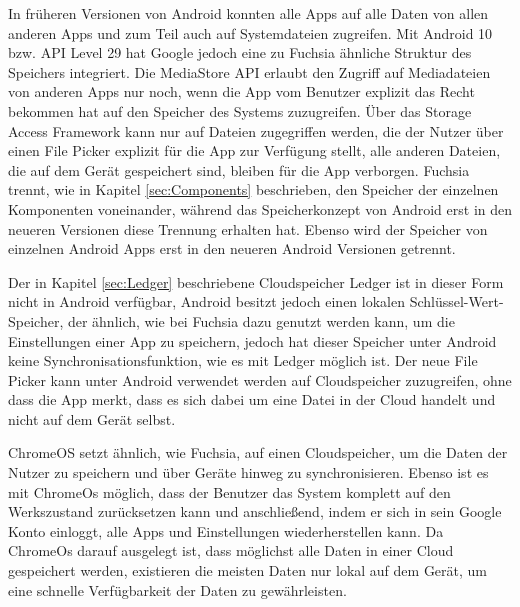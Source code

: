 \documentclass[a4paper]{scrartcl}
\begin{document}
In früheren Versionen von Android konnten alle Apps auf alle Daten von allen anderen Apps und zum Teil auch auf Systemdateien zugreifen. Mit Android 10 bzw. API Level 29 hat Google jedoch eine zu Fuchsia ähnliche Struktur des Speichers integriert. Die MediaStore API erlaubt den Zugriff auf Mediadateien von anderen Apps nur noch, wenn die App vom Benutzer explizit das Recht bekommen hat auf den Speicher des Systems zuzugreifen. Über das Storage Access Framework kann nur auf Dateien zugegriffen werden, die der Nutzer über einen File Picker explizit für die App zur Verfügung stellt, alle anderen Dateien, die auf dem Gerät gespeichert sind, bleiben für die App verborgen. Fuchsia trennt, wie in Kapitel \ref{sec:Components} beschrieben, den Speicher der einzelnen Komponenten voneinander, während das Speicherkonzept von Android erst in den neueren Versionen diese Trennung erhalten hat. Ebenso wird der Speicher von einzelnen Android Apps erst in den neueren Android Versionen getrennt. \cite{Android.Storage.Overview}


Der in Kapitel \ref{sec:Ledger} beschriebene Cloudspeicher Ledger ist in dieser Form nicht in Android verfügbar, Android besitzt jedoch einen lokalen Schlüssel-Wert-Speicher, der ähnlich, wie bei Fuchsia dazu genutzt werden kann, um die Einstellungen einer App zu speichern, jedoch hat dieser Speicher unter Android keine Synchronisationsfunktion, wie es mit Ledger möglich ist. \cite{Android.Storage.Overview} Der neue File Picker kann unter Android verwendet werden auf Cloudspeicher zuzugreifen, ohne dass die App merkt, dass es sich dabei um eine Datei in der Cloud handelt und nicht auf dem Gerät selbst. \cite{Android.Storage.DocumentProvider}

ChromeOS setzt ähnlich, wie Fuchsia, auf einen Cloudspeicher, um die Daten der Nutzer zu speichern und über Geräte hinweg zu synchronisieren. Ebenso ist es mit ChromeOs möglich, dass der Benutzer das System komplett auf den Werkszustand zurücksetzen kann und anschließend, indem er sich in sein Google Konto einloggt, alle Apps und Einstellungen wiederherstellen kann. Da ChromeOs darauf ausgelegt ist, dass möglichst alle Daten in einer Cloud gespeichert werden, existieren die meisten Daten nur lokal auf dem Gerät, um eine schnelle Verfügbarkeit der Daten zu gewährleisten.
\end{document}
